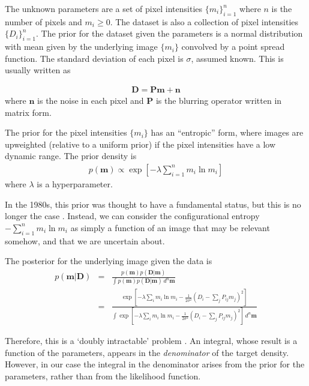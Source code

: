 \documentclass[journal,article,accept,moreauthors,pdftex,12pt,a4paper]{mdpi}
\begin{document}
The unknown parameters are a set of pixel intensities
$\{m_i\}_{i=1}^n$ where $n$ is the number of pixels and $m_i \geq 0$.
The dataset is also a collection of pixel intensities $\{D_i\}_{i=1}^n$.
The prior for the dataset given the parameters is a normal distribution
with mean given by the underlying image $\{m_i\}$ convolved by
a point spread function. The standard deviation of each pixel is
$\sigma$, assumed known. This is usually written as

\begin{eqnarray}
\boldsymbol{D} = \boldsymbol{P}\boldsymbol{m} + \boldsymbol{n}
\end{eqnarray}
where $\boldsymbol{n}$ is the noise in each pixel and $\boldsymbol{P}$ is
the blurring operator written in matrix form.

The prior for the pixel intensities $\{m_i\}$ has an ``entropic'' form,
where images are upweighted (relative to a uniform prior) if the pixel
intensities have a low dynamic range. The prior density is
\begin{eqnarray}
p(\boldsymbol{m}) \propto \exp
\left[
-\lambda \sum_{i=1}^n m_i \ln m_i
\right]
\end{eqnarray}
where $\lambda$ is a hyperparameter.

In the 1980s, this prior was thought to have a fundamental status, but this
is no longer the case \citep{massinf}. Instead, we can consider the configurational
entropy $-\sum_{i=1}^n m_i \ln m_i$ as simply a function of an image that may
be relevant somehow, and that we are uncertain about.

The posterior for the underlying image given the data is
\begin{eqnarray}
p(\boldsymbol{m} | \boldsymbol{D})
&=& \frac{p(\boldsymbol{m})p(\boldsymbol{D}|\boldsymbol{m})}
{\int p(\boldsymbol{m})p(\boldsymbol{D}|\boldsymbol{m}) \,d^n\boldsymbol{m}}\\
&=& \frac{\exp\left[-\lambda \sum_i m_i\ln m_i
-\frac{1}{2\sigma^2}\left(D_i - \sum_{j} P_{ij}m_{j}\right)^2\right]}
{\int \exp\left[-\lambda \sum_i m_i\ln m_i
-\frac{1}{2\sigma^2}\left(D_i - \sum_{j} P_{ij}m_{j}\right)^2\right]\, d^n\boldsymbol{m}}
\end{eqnarray}

Therefore, this is a `doubly intractable' problem \citep{murray}. An integral, whose
result is a function of the parameters, appears in the {\em denominator} of the
target density. However, in our case the integral in the
denominator arises from the prior for the parameters, rather than from the
likelihood function.
\end{document}
